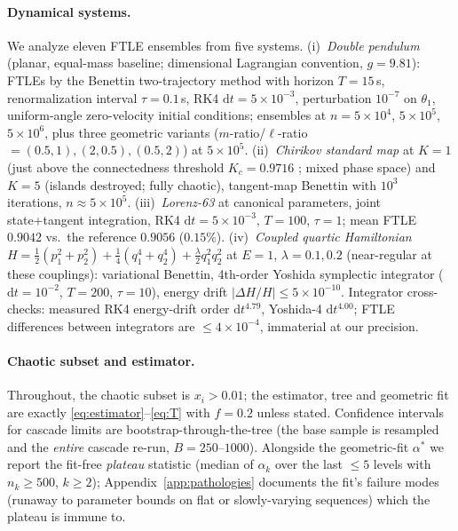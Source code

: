 \documentclass[11pt,a4paper]{article}
\theoremstyle{remark}
\begin{document}
\paragraph{Dynamical systems.} We analyze eleven FTLE ensembles from five systems.
(i)~\emph{Double pendulum} (planar, equal-mass baseline; dimensional Lagrangian convention,
$g = 9.81$): FTLEs by the Benettin two-trajectory method \cite{benettin} with horizon $T = 15$\,s,
renormalization interval $\tau = 0.1$\,s, RK4 $\mathrm{d}t = 5\times10^{-3}$, perturbation
$10^{-7}$ on $\theta_1$, uniform-angle zero-velocity initial conditions; ensembles at
$n = 5\times10^{4}$, $5\times10^{5}$, $5\times10^{6}$, plus three geometric variants
($m$-ratio/$\ell$-ratio $= (0.5,1), (2,0.5), (0.5,2)$) at $5\times10^{5}$.
(ii)~\emph{Chirikov standard map} \cite{chirikov} at $K = 1$ (just above the connectedness
threshold $K_c = 0.9716$ \cite{greene}; mixed phase space) and $K = 5$ (islands destroyed; fully
chaotic), tangent-map Benettin with $10^{3}$ iterations, $n \approx 5\times10^{5}$.
(iii)~\emph{Lorenz-63} \cite{lorenz} at canonical parameters, joint state+tangent integration,
RK4 $\mathrm{d}t = 5\times10^{-3}$, $T = 100$, $\tau = 1$; mean FTLE $0.9042$ vs.\ the reference
$0.9056$ ($0.15\%$).
(iv)~\emph{Coupled quartic Hamiltonian} $H = \tfrac12(p_1^2{+}p_2^2) + \tfrac14(q_1^4{+}q_2^4) +
\tfrac\lambda2 q_1^2q_2^2$ at $E = 1$, $\lambda = 0.1, 0.2$ (near-regular at these couplings):
variational Benettin, 4th-order Yoshida symplectic integrator \cite{yoshida}
($\mathrm{d}t = 10^{-2}$, $T = 200$, $\tau = 10$), energy drift $|\Delta H/H| \le 5\times10^{-10}$.
Integrator cross-checks: measured RK4 energy-drift order $\mathrm{d}t^{4.79}$, Yoshida-4
$\mathrm{d}t^{4.00}$; FTLE differences between integrators are $\le 4\times10^{-4}$, immaterial
at our precision.

\paragraph{Chaotic subset and estimator.} Throughout, the chaotic subset is $x_i > 0.01$; the
estimator, tree and geometric fit are exactly \eqref{eq:estimator}--\eqref{eq:T} with $f = 0.2$
unless stated. Confidence intervals for cascade limits are bootstrap-through-the-tree (the base
sample is resampled and the \emph{entire} cascade re-run, $B = 250$--$1000$). Alongside the
geometric-fit $\alpha^*$ we report the fit-free \emph{plateau} statistic (median of $\alpha_k$ over
the last $\le 5$ levels with $n_k \ge 500$, $k \ge 2$); Appendix~\ref{app:pathologies} documents the
fit's failure modes (runaway to parameter bounds on flat or slowly-varying sequences) which the
plateau is immune to.
\end{document}
